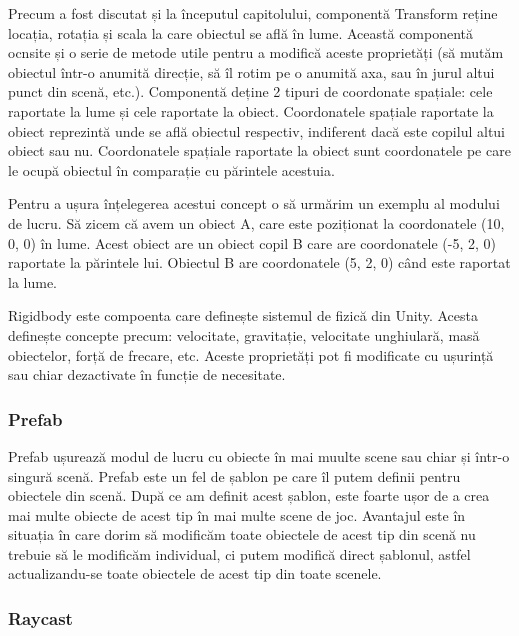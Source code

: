 \documentclass[12pt, a4paper]{article}
\begin{document}
	Precum a fost discutat și la începutul capitolului, componentă Transform reține locația, rotația și scala la care obiectul se află în lume. Această componentă ocnsite și o serie de metode utile pentru a modifică aceste proprietăți (să mutăm obiectul într-o anumită direcție, să îl rotim pe o anumită axa, sau în jurul altui punct din scenă, etc.). Componentă deține 2 tipuri de coordonate spațiale: cele raportate la lume și cele raportate la obiect. Coordonatele spațiale raportate la obiect reprezintă unde se află obiectul respectiv, indiferent dacă este copilul altui obiect sau nu. Coordonatele spațiale raportate la obiect sunt coordonatele pe care le ocupă obiectul în comparație cu părintele acestuia.
	\newline
	
	Pentru a ușura înțelegerea acestui concept o să urmărim un exemplu al modului de lucru. Să zicem că avem un obiect A, care este poziționat la coordonatele (10, 0, 0) în lume. Acest obiect are un obiect copil B care are coordonatele (-5, 2, 0) raportate la părintele lui. Obiectul B are coordonatele (5, 2, 0) când este raportat la lume.
	\newline
	
	Rigidbody este compoenta care definește sistemul de fizică din Unity. Acesta definește concepte precum: velocitate, gravitație, velocitate unghiulară, masă obiectelor, forță de frecare, etc. Aceste proprietăți pot fi modificate cu ușurință sau chiar dezactivate în funcție de necesitate.
	
	
	
	
	
	\subsubsection{Prefab}
	
	Prefab ușurează modul de lucru cu obiecte în mai muulte scene sau chiar și într-o singură scenă. Prefab este un fel de șablon pe care îl putem definii pentru obiectele din scenă. După ce am definit acest șablon, este foarte ușor de a crea mai multe obiecte de acest tip în mai multe scene de joc. Avantajul este în situația în care dorim să modificăm toate obiectele de acest tip din scenă nu trebuie să le modificăm individual, ci putem modifică direct șablonul, astfel actualizandu-se toate obiectele de acest tip din toate scenele.
	
	
	
	
	
	\subsubsection{Raycast}
	
\end{document}
